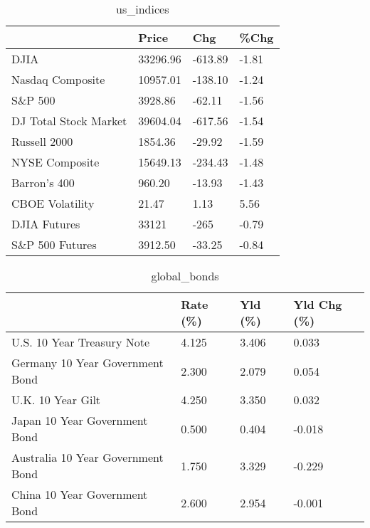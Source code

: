 \documentclass{article}%
\begin{document}
%


\begin{table}[htbp]%
\caption{us\_indices}%
\centering%
\begin{adjustbox}{width=1\textwidth}%
\begin{tabular}{llll}
\toprule
                      &    Price &     Chg &  \%Chg \\
\midrule
                 DJIA & 33296.96 & -613.89 & -1.81 \\
     Nasdaq Composite & 10957.01 & -138.10 & -1.24 \\
              S\&P 500 &  3928.86 &  -62.11 & -1.56 \\
DJ Total Stock Market & 39604.04 & -617.56 & -1.54 \\
         Russell 2000 &  1854.36 &  -29.92 & -1.59 \\
       NYSE Composite & 15649.13 & -234.43 & -1.48 \\
         Barron's 400 &   960.20 &  -13.93 & -1.43 \\
      CBOE Volatility &    21.47 &    1.13 &  5.56 \\
         DJIA Futures &    33121 &    -265 & -0.79 \\
      S\&P 500 Futures &  3912.50 &  -33.25 & -0.84 \\
\bottomrule
\end{tabular}
%
\end{adjustbox}%
\end{table}

%


\begin{table}[htbp]%
\caption{global\_bonds}%
\centering%
\begin{adjustbox}{width=1\textwidth}%
\begin{tabular}{llll}
\toprule
                                  & Rate (\%) & Yld (\%) & Yld Chg (\%) \\
\midrule
       U.S. 10 Year Treasury Note &    4.125 &   3.406 &       0.033 \\
  Germany 10 Year Government Bond &    2.300 &   2.079 &       0.054 \\
                U.K. 10 Year Gilt &    4.250 &   3.350 &       0.032 \\
    Japan 10 Year Government Bond &    0.500 &   0.404 &      -0.018 \\
Australia 10 Year Government Bond &    1.750 &   3.329 &      -0.229 \\
    China 10 Year Government Bond &    2.600 &   2.954 &      -0.001 \\
\bottomrule
\end{tabular}
%
\end{adjustbox}%
\end{table}
\end{document}
